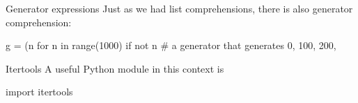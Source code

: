 \documentclass[hyperref={pdfpagelabels=false},table]{beamer}
\begin{document}
\begin{frame}[fragile]{Generator expressions}
Just as we had list comprehensions, there is also \alert{generator comprehension}:
\begin{python}
g = (n for n in range(1000) if not n %
# a generator that generates 0, 100, 200, 
\end{python}
\end{frame}

\begin{frame}[fragile]{Itertools}
\vfill
A useful Python module in this context is
\vskip 5pt 
\begin{python}
import itertools
\end{python}
\end{frame}
\end{document}
